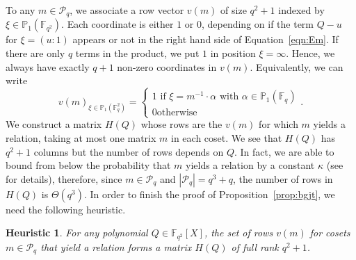\documentclass[a4paper,11pt]{article}
\theoremstyle{break}
\newtheorem{heur}[thm]{Heuristic}
\theoremstyle{sc}
\theoremstyle{definition}
\theoremstyle{remark}
\begin{document}
To any $m\in\mathcal P_q$, we associate a row vector $v(m)$ of size $q^2+1$
indexed by $\xi\in\mathbb{P}_1(\mathbb{F}_{q^2})$. Each coordinate is either $1$
or $0$, depending on if the term $Q-u$ for $\xi=(u:1)$ appears or not in the
right hand side of Equation~\eqref{eqn:Em}. If there
are only $q$ terms in the product, we put $1$ in position $\xi=\infty$. Hence, we
always have exactly $q+1$ non-zero coordinates in $v(m)$. Equivalently, we can
write
\[
  v(m)_{\xi\in\mathbb{P}_1(\mathbb{F}_q^2)}=\begin{cases} 1\text{ if
    }\xi=m^{-1}\cdot\alpha\text{ with }\alpha\in\mathbb{P}_1(\mathbb{F}_q) \\ 0\text{
    otherwise} \end{cases}.
\]
We construct a matrix $H(Q)$ whose rows are the $v(m)$ for which $m$ yields a
relation, taking at most one matrix $m$ in each coset. We see that $H(Q)$ has
$q^2+1$ columns but the number of rows depends on $Q$. In fact, we are able to
bound from below the probability that $m$ yields a relation by a constant $\kappa$
(see~\cite{BGJT13} for details),
therefore, since $m\in\mathcal P_q$ and $|\mathcal P_q|=q^3+q$, the number of
rows in $H(Q)$ is $\Theta(q^3)$. In order to finish the proof of
Proposition~\ref{prop:bgjt}, we need the following heuristic.
\begin{heur}
  \label{heur:full-rank}
  For any polynomial $Q\in\mathbb{F}_{q^{2}}[X]$, the set of rows $v(m)$ for
  cosets $m\in\mathcal P_q$ that yield a relation forms a matrix $H(Q)$ of
  full rank $q^2+1$.
\end{heur}
\end{document}
